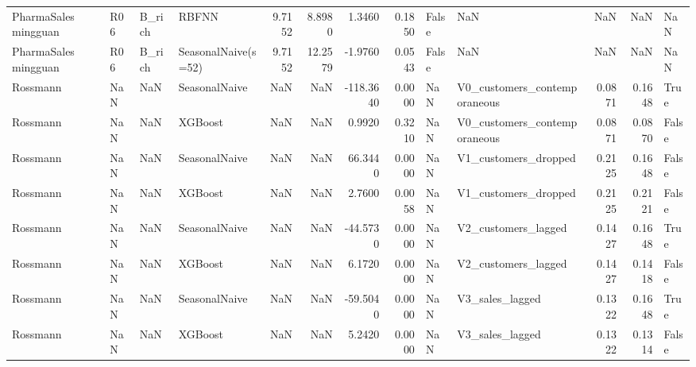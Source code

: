 \begin{table}
\begin{tabular}{llllrrrrllrrl}
PharmaSales mingguan & R06 & B\_rich & RBFNN & 9.7152 & 8.8980 & 1.3460 & 0.1850 & False & NaN & NaN & NaN & NaN \\
PharmaSales mingguan & R06 & B\_rich & SeasonalNaive(s=52) & 9.7152 & 12.2579 & -1.9760 & 0.0543 & False & NaN & NaN & NaN & NaN \\
Rossmann & NaN & NaN & SeasonalNaive & NaN & NaN & -118.3640 & 0.0000 & NaN & V0\_customers\_contemporaneous & 0.0871 & 0.1648 & True \\
Rossmann & NaN & NaN & XGBoost & NaN & NaN & 0.9920 & 0.3210 & NaN & V0\_customers\_contemporaneous & 0.0871 & 0.0870 & False \\
Rossmann & NaN & NaN & SeasonalNaive & NaN & NaN & 66.3440 & 0.0000 & NaN & V1\_customers\_dropped & 0.2125 & 0.1648 & False \\
Rossmann & NaN & NaN & XGBoost & NaN & NaN & 2.7600 & 0.0058 & NaN & V1\_customers\_dropped & 0.2125 & 0.2121 & False \\
Rossmann & NaN & NaN & SeasonalNaive & NaN & NaN & -44.5730 & 0.0000 & NaN & V2\_customers\_lagged & 0.1427 & 0.1648 & True \\
Rossmann & NaN & NaN & XGBoost & NaN & NaN & 6.1720 & 0.0000 & NaN & V2\_customers\_lagged & 0.1427 & 0.1418 & False \\
Rossmann & NaN & NaN & SeasonalNaive & NaN & NaN & -59.5040 & 0.0000 & NaN & V3\_sales\_lagged & 0.1322 & 0.1648 & True \\
Rossmann & NaN & NaN & XGBoost & NaN & NaN & 5.2420 & 0.0000 & NaN & V3\_sales\_lagged & 0.1322 & 0.1314 & False \\
\bottomrule
\end{tabular}
\end{table}
